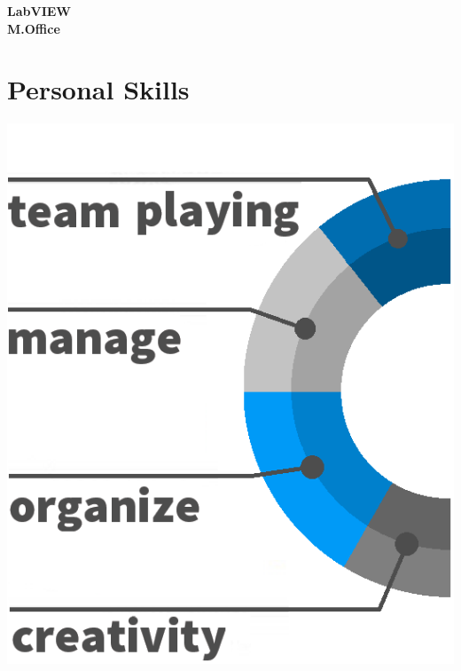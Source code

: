 \documentclass[]{friggeri-cv}
\begin{document}
\begin{aside}
    \textbf{LabVIEW}\\%
    \textbf{M.Office}\\%
  \section{Personal Skills}
    \includegraphics[scale=0.6]{img/PersonalSkillsPhoto.png}

\end{aside}
\end{document}
